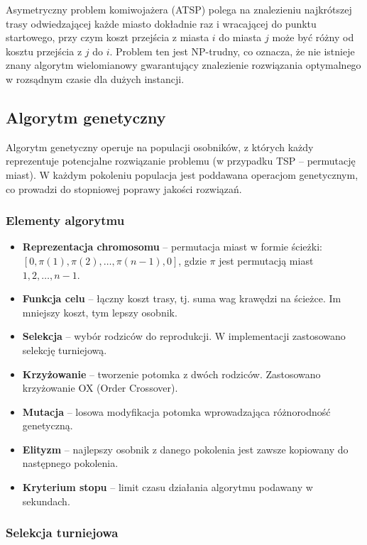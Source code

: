 \documentclass[a4paper,12pt]{article}
\begin{document}
Asymetryczny problem komiwojażera (ATSP) polega na znalezieniu najkrótszej trasy odwiedzającej każde miasto
dokładnie raz i wracającej do punktu startowego, przy czym koszt przejścia z miasta $i$ do miasta $j$ może być
różny od kosztu przejścia z $j$ do $i$. Problem ten jest NP-trudny, co oznacza, że nie istnieje znany algorytm
wielomianowy gwarantujący znalezienie rozwiązania optymalnego w rozsądnym czasie dla dużych instancji.

\subsection{Algorytm genetyczny}

Algorytm genetyczny operuje na populacji osobników, z których każdy reprezentuje potencjalne rozwiązanie
problemu (w przypadku TSP -- permutację miast). W każdym pokoleniu populacja jest poddawana operacjom
genetycznym, co prowadzi do stopniowej poprawy jakości rozwiązań.

\subsubsection{Elementy algorytmu}

\begin{itemize}
    \item \textbf{Reprezentacja chromosomu} -- permutacja miast w formie ścieżki: $[0, \pi(1), \pi(2), \ldots, \pi(n-1), 0]$,
    gdzie $\pi$ jest permutacją miast $1, 2, \ldots, n-1$.
    \item \textbf{Funkcja celu} -- łączny koszt trasy, tj. suma wag krawędzi na ścieżce. Im mniejszy koszt, tym lepszy osobnik.
    \item \textbf{Selekcja} -- wybór rodziców do reprodukcji. W implementacji zastosowano selekcję turniejową.
    \item \textbf{Krzyżowanie} -- tworzenie potomka z dwóch rodziców. Zastosowano krzyżowanie OX (Order Crossover).
    \item \textbf{Mutacja} -- losowa modyfikacja potomka wprowadzająca różnorodność genetyczną.
    \item \textbf{Elityzm} -- najlepszy osobnik z danego pokolenia jest zawsze kopiowany do następnego pokolenia.
    \item \textbf{Kryterium stopu} -- limit czasu działania algorytmu podawany w sekundach.
\end{itemize}

\subsubsection{Selekcja turniejowa}
\end{document}

